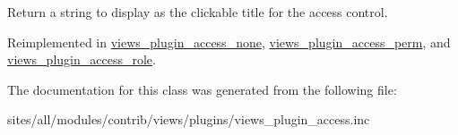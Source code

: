 Return a string to display as the clickable title for the access control. 

Reimplemented in \hyperlink{classviews__plugin__access__none_b76847f19e943e463cbc2ff1723bdb00}{views\_\-plugin\_\-access\_\-none}, \hyperlink{classviews__plugin__access__perm_1e0e33b03ffddf2b98c60740222d8ca5}{views\_\-plugin\_\-access\_\-perm}, and \hyperlink{classviews__plugin__access__role_25dbbc0f06093f0e4ee13182ea0d277f}{views\_\-plugin\_\-access\_\-role}.

The documentation for this class was generated from the following file:\begin{CompactItemize}
\item 
sites/all/modules/contrib/views/plugins/views\_\-plugin\_\-access.inc\end{CompactItemize}
